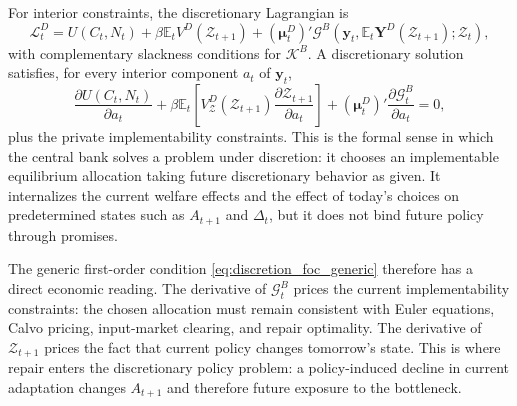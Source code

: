 ﻿\documentclass[12pt]{article}
\theoremstyle{remark}
\newcommand{\E}{\mathbb E}
\begin{document}
For interior constraints, the discretionary Lagrangian is
\begin{equation}
    \mathcal L_t^D
    =
    U(C_t,N_t)
    +
    \beta\E_t V^D(\mathcal Z_{t+1})
    +
    (\boldsymbol\mu_t^D)'
    \mathcal G^B
    \left(
        \mathbf y_t,
        \E_t\mathbf Y^D(\mathcal Z_{t+1});
        \mathcal Z_t
    \right),
    \label{eq:discretion_lagrangian}
\end{equation}
with complementary slackness conditions for $\mathcal K^B$. A discretionary solution satisfies,
for every interior component $a_t$ of $\mathbf y_t$,
\begin{equation}
    \frac{\partial U(C_t,N_t)}{\partial a_t}
    +
    \beta
    \E_t
    \left[
        V^D_{\mathcal Z}(\mathcal Z_{t+1})
        \frac{\partial \mathcal Z_{t+1}}{\partial a_t}
    \right]
    +
    (\boldsymbol\mu_t^D)'
    \frac{\partial \mathcal G_t^B}{\partial a_t}
    =
    0,
    \label{eq:discretion_foc_generic}
\end{equation}
plus the private implementability constraints. This is the formal sense in which the central bank
solves a problem under discretion: it chooses an implementable equilibrium allocation taking
future discretionary behavior as given. It internalizes the current welfare effects and the effect
of today's choices on predetermined states such as $A_{t+1}$ and $\Delta_t$, but it does not bind
future policy through promises.

The generic first-order condition \eqref{eq:discretion_foc_generic} therefore has a direct
economic reading. The derivative of $\mathcal G_t^B$ prices the current implementability
constraints: the chosen allocation must remain consistent with Euler equations, Calvo pricing,
input-market clearing, and repair optimality. The derivative of $\mathcal Z_{t+1}$ prices the
fact that current policy changes tomorrow's state. This is where repair enters the discretionary
policy problem: a policy-induced decline in current adaptation changes $A_{t+1}$ and therefore
future exposure to the bottleneck.
\end{document}
